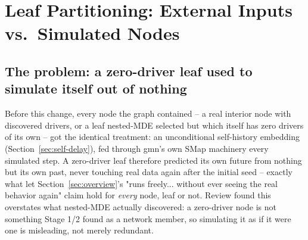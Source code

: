 \documentclass[11pt]{article}
\begin{document}
\newpage
\section{Leaf Partitioning: External Inputs vs.\ Simulated Nodes}
\label{sec:partition}

\subsection{The problem: a zero-driver leaf used to simulate itself out of nothing}
Before this change, every node the graph contained -- a real interior node with discovered drivers, or a leaf nested-MDE selected but which itself has zero drivers of its own -- got the identical treatment: an unconditional self-history embedding (Section~\ref{sec:self-delay}), fed through gmn's own SMap machinery every simulated step. A zero-driver leaf therefore predicted its own future from nothing but its own past, never touching real data again after the initial seed -- exactly what let Section~\ref{sec:overview}'s "runs freely... without ever seeing the real behavior again" claim hold for \emph{every} node, leaf or not. Review found this overstates what nested-MDE actually discovered: a zero-driver node is not something Stage 1/2 found as a network member, so simulating it as if it were one is misleading, not merely redundant.
\end{document}

